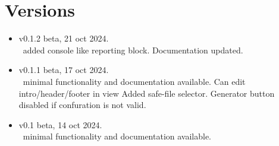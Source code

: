 \chapter{Versions}\label{Versions}

\begin{itemize}
    \item v0.1.2 beta, 21 oct 2024.\\
        \GS\ added console like reporting block.
        Documentation updated.
    \item v0.1.1 beta, 17 oct 2024.\\
        \GS\ minimal functionality and documentation available.
        Can edit intro/header/footer in view Added safe-file selector.
        Generator button disabled if confuration is not valid.
    \item v0.1 beta, 14 oct 2024.\\
        \GS\ minimal functionality and documentation available.
\end{itemize}
